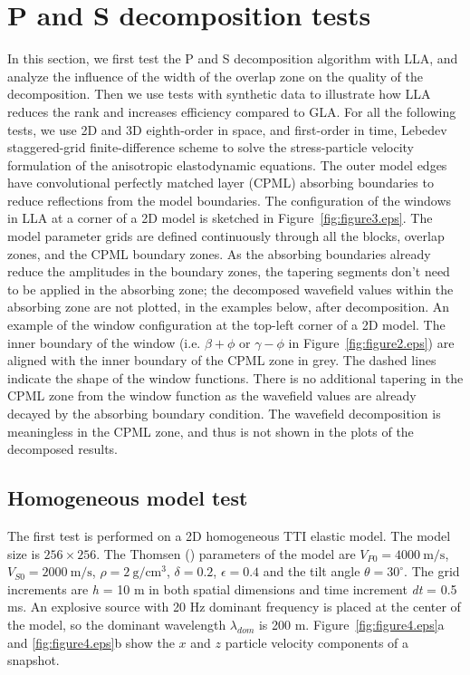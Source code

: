 \documentclass[manuscript,ulem,graphix,revised]{geophysics}
\begin{document}
\section{P and S decomposition tests}
\indent\indent
In this section, we first test the P and S decomposition algorithm with LLA, and analyze the influence of the width of the overlap zone on the quality of the decomposition. Then we use tests with synthetic data to illustrate how LLA reduces the rank and increases efficiency compared to GLA.
For all the following tests, we use 2D and 3D eighth-order in space, and first-order in time, Lebedev staggered-grid finite-difference scheme \citep{vadim10} to solve the stress-particle velocity formulation of the anisotropic elastodynamic equations. The outer model edges have convolutional perfectly matched layer (CPML) absorbing boundaries \citep{komatitsch07} to reduce reflections from the model boundaries. 
The configuration of the windows in LLA at a corner of a 2D model is sketched in Figure~\ref{fig:figure3.eps}. The model parameter grids are defined continuously through all the blocks, overlap zones, and the CPML boundary zones. As the absorbing boundaries already reduce the amplitudes in the boundary zones, the tapering segments don't need to be applied in the absorbing zone; the decomposed wavefield values within the absorbing zone are not plotted, in the examples below, after decomposition.
 {
An example of the window configuration at the top-left corner of a 2D model. 
The inner boundary of the window (i.e. $\beta+\phi$ or $\gamma-\phi$ in Figure~\ref{fig:figure2.eps}) are aligned with the inner boundary of the CPML zone in grey.
The dashed lines indicate the shape of the window functions. There is no additional tapering in the CPML zone from the window function as the wavefield values are already decayed by the absorbing boundary condition. The wavefield decomposition is meaningless in the CPML zone, and thus is not shown in the plots of the decomposed results.
}
\subsection{Homogeneous model test}
\indent\indent
The first test is performed on a 2D homogeneous TTI elastic model. The model size is $256 \times 256$. The Thomsen (\citeyear{leon86}) parameters of the model are $V_{P0}=4000~\mathrm{m/s}$, $V_{S0}=2000~\mathrm{m/s}$, $\rho=2~\mathrm{g/cm^3}$, $\delta=0.2$, $\epsilon=0.4$ and the tilt angle $\theta=30^\circ$. The grid increments are \textit{h} = 10 m in both spatial dimensions and time increment \textit{dt} = 0.5 ms. An explosive source with 20 Hz dominant frequency is placed at the center of the model, so the dominant wavelength $\lambda_{dom}$ is 200 m. Figure~\ref{fig:figure4.eps}a and \ref{fig:figure4.eps}b show the $x$ and $z$ particle velocity components of a snapshot. 
\end{document}
